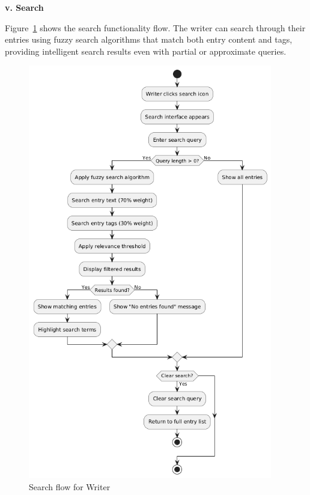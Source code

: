 \textbf{v. Search}

Figure~\ref{fig:search-flow} shows the search functionality flow. The writer can search through their entries using fuzzy search algorithms that match both entry content and tags, providing intelligent search results even with partial or approximate queries.

\begin{figure}[H]
\centering
\includegraphics[width=0.95\textwidth,height=0.7\textheight,keepaspectratio]{files/imgs/search_flow.png}
\caption{Search flow for Writer}
\label{fig:search-flow}
\end{figure}
\clearpage

